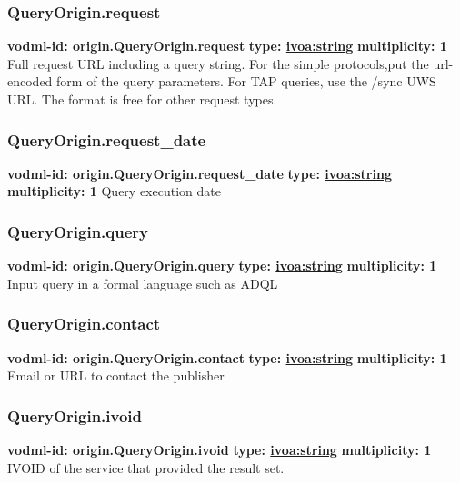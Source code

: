     \subsubsection{QueryOrigin.request}
      \textbf{vodml-id: origin.QueryOrigin.request} \newline
      \textbf{type: \hyperref[sect:ivoa]{ivoa:string}} \newline
      \textbf{multiplicity: 1} \newline
      Full request URL including a query string. For the simple protocols,put the url-encoded form of the query parameters. For TAP queries, use the /sync UWS \citep{2016ivoa.spec.1024H} URL. The format is free for other request types.

    \subsubsection{QueryOrigin.request\_date}
      \textbf{vodml-id: origin.QueryOrigin.request\_date} \newline
      \textbf{type: \hyperref[sect:ivoa]{ivoa:string}} \newline
      \textbf{multiplicity: 1} \newline
      Query execution date

    \subsubsection{QueryOrigin.query}
      \textbf{vodml-id: origin.QueryOrigin.query} \newline
      \textbf{type: \hyperref[sect:ivoa]{ivoa:string}} \newline
      \textbf{multiplicity: 1} \newline
      Input query in a formal language such as ADQL \citep{2023ivoa.spec.1215M}

    \subsubsection{QueryOrigin.contact}
      \textbf{vodml-id: origin.QueryOrigin.contact} \newline
      \textbf{type: \hyperref[sect:ivoa]{ivoa:string}} \newline
      \textbf{multiplicity: 1} \newline
      Email or URL to contact the publisher

    \subsubsection{QueryOrigin.ivoid}
      \textbf{vodml-id: origin.QueryOrigin.ivoid} \newline
      \textbf{type: \hyperref[sect:ivoa]{ivoa:string}} \newline
      \textbf{multiplicity: 1} \newline
      IVOID of the service that provided the result set.

